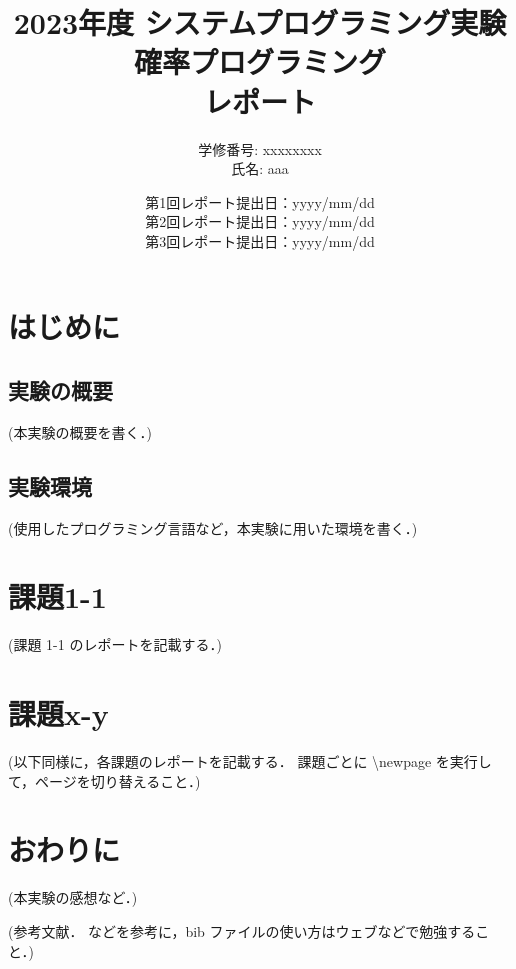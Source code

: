 \documentclass[11pt, a4paper, titlepage]{jarticle}
\title{
2023年度 システムプログラミング実験\\
確率プログラミング\\
レポート}
\author{
学修番号: xxxxxxxx \\
氏名: aaa \\
}
\begin{document}
\date{
第1回レポート提出日：yyyy/mm/dd \\
第2回レポート提出日：yyyy/mm/dd \\
第3回レポート提出日：yyyy/mm/dd \\
}
\maketitle

\section*{はじめに}

\subsection*{実験の概要}

(本実験の概要を書く．)

\subsection*{実験環境}

(使用したプログラミング言語など，本実験に用いた環境を書く．)

\newpage
\section*{課題1-1}

(課題 1-1 のレポートを記載する．)

\newpage
\section*{課題x-y}

(以下同様に，各課題のレポートを記載する．
課題ごとに \textbackslash newpage を実行して，ページを切り替えること．)

\newpage
\section*{おわりに}

(本実験の感想など．)

\newpage

 

(参考文献．\cite{example} などを参考に，bib ファイルの使い方はウェブなどで勉強すること．)
\end{document}
